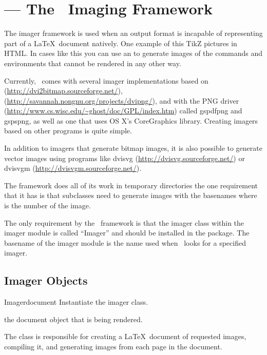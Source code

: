 
\section{ --- The \plasTeX\ Imaging Framework\label{sec:imager-api}}


The imager framework is used when an output format is incapable of
representing part of a \LaTeX\ document natively. One example of this
TikZ pictures in HTML.  In cases like this you can use an
 to generate images of the commands and environments
that cannot be rendered in any other way.

Currently, \plasTeX\ comes with several imager implementations based
on  (\url{http://dvi2bitmap.sourceforge.net/}),
 (\url{http://savannah.nongnu.org/projects/dvipng/}),
and  with the PNG driver
(\url{http://www.cs.wisc.edu/~ghost/doc/GPL/index.htm}) called gspdfpng
and gspspng, as well as one that uses OS X's CoreGraphics library.
Creating imagers based on other programs is quite simple.

In addition to imagers that generate bitmap images, it is also possible to
generate vector images using programs like dvisvg
(\url{http://dvisvg.sourceforge.net/}) or
dvisvgm (\url{http://dvisvgm.sourceforge.net/}).

The  framework does all of its work in temporary directories
the one requirement that it has is that  subclasses need
to generate images with the basenames  where  is
the number of the image.

The only requirement by the \plasTeX\ framework is that the imager class
within the imager module is called ``Imager'' and should be installed in
the  package.  The basename of the imager
module is the name used when \plasTeX\ looks for a specified imager.


\subsection{Imager Objects}

\begin{classdesc}{Imager}{document}
Instantiate the imager class.

 the document object that is being rendered.

The  class is responsible for creating a \LaTeX\ document
of requested images, compiling it, and generating images from each
page in the document.
\end{classdesc}

